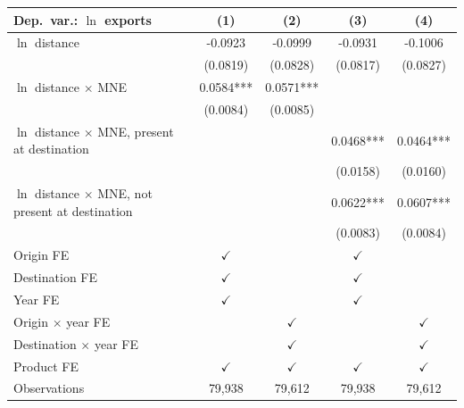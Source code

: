 \begin{tabular}{lcccc} \hline
Dep.\ var.: $\ln$ exports & (1) & (2) & (3) & (4) \\ \hline
$\ln$ distance & -0.0923 & -0.0999 & -0.0931 & -0.1006 \\
 & (0.0819) & (0.0828) & (0.0817) & (0.0827) \\
$\ln$ distance $\times$ MNE & 0.0584*** & 0.0571*** &  &  \\
 & (0.0084) & (0.0085) &  &  \\
$\ln$ distance $\times$ MNE, present at destination &  &  & 0.0468*** & 0.0464*** \\
 &  &  & (0.0158) & (0.0160) \\
$\ln$ distance $\times$ MNE, not present at destination &  &  & 0.0622*** & 0.0607*** \\
 &  &  & (0.0083) & (0.0084) \\
\hline
Origin FE & $\checkmark$ &  & $\checkmark$ &  \\
Destination FE & $\checkmark$ &  & $\checkmark$ &  \\
Year FE & $\checkmark$ &  & $\checkmark$ &  \\
Origin $\times$ year FE &  & $\checkmark$ &  & $\checkmark$ \\
Destination $\times$ year FE &  & $\checkmark$ &  & $\checkmark$ \\
Product FE & $\checkmark$ & $\checkmark$ & $\checkmark$ & $\checkmark$ \\
\hline
Observations & 79,938 & 79,612 & 79,938 & 79,612 \\
\hline
\end{tabular}
